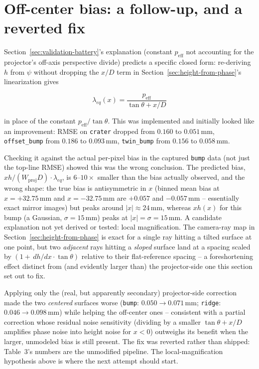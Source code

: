 \documentclass[11pt]{article}
\begin{document}
\section{Off-center bias: a follow-up, and a reverted fix}
\label{sec:off-center-followup}

Section~\ref{sec:validation-battery}'s explanation (constant $p_{\text{eff}}$
not accounting for the projector's off-axis perspective divide) predicts a
specific closed form: re-deriving $h$ from $\psi$ without dropping the
$x/D$ term in Section~\ref{sec:height-from-phase}'s linearization gives

\begin{equation}
  \lambda_{eq}(x) = \frac{p_{\text{eff}}}{\tan\theta + x/D}
\end{equation}

in place of the constant $p_{\text{eff}}/\tan\theta$. This was implemented
and initially looked like an improvement: RMSE on \texttt{crater} dropped
from $0.160$ to $0.051$\,mm, \texttt{offset\_bump} from $0.186$ to
$0.093$\,mm, \texttt{twin\_bump} from $0.156$ to $0.058$\,mm.

Checking it against the actual per-pixel bias in the captured
\texttt{bump} data (not just the top-line RMSE) showed this was the wrong
conclusion. The predicted bias, $x h/(W_{\text{proj}}D) \cdot \lambda_{eq}$,
is $6$--$10\times$ smaller than the bias actually observed, and the wrong
shape: the true bias is antisymmetric in $x$ (binned mean bias at
$x=+32.75$\,mm and $x=-32.75$\,mm are $+0.057$ and $-0.057$\,mm --
essentially exact mirror images) but peaks around $|x|\approx24$\,mm,
whereas $xh(x)$ for this bump (a Gaussian, $\sigma=15$\,mm) peaks at
$|x|=\sigma=15$\,mm. A candidate explanation not yet derived or tested:
local magnification. The camera-ray map in
Section~\ref{sec:height-from-phase} is exact for a single ray hitting a
tilted surface at one point, but two \emph{adjacent} rays hitting a
\emph{sloped} surface land at a spacing scaled by
$(1+\,dh/dx\cdot\tan\theta)$ relative to their flat-reference spacing --
a foreshortening effect distinct from (and evidently larger than) the
projector-side one this section set out to fix.

Applying only the (real, but apparently secondary) projector-side
correction made the two \emph{centered} surfaces worse
(\texttt{bump}: $0.050\to0.071$\,mm; \texttt{ridge}:
$0.046\to0.098$\,mm) while helping the off-center ones -- consistent with
a partial correction whose residual noise sensitivity (dividing by a
smaller $\tan\theta+x/D$ amplifies phase noise into height noise for
$x<0$) outweighs its benefit when the larger, unmodeled bias is still
present. The fix was reverted rather than shipped: Table~3's numbers are
the unmodified pipeline. The local-magnification hypothesis above is
where the next attempt should start.
\end{document}
